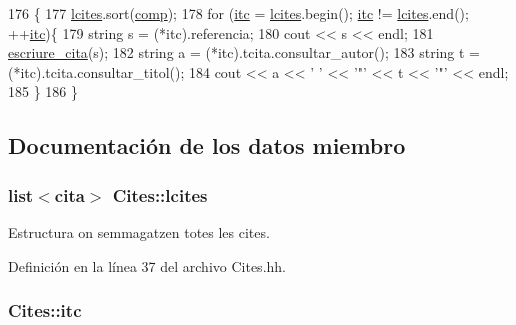 \begin{DoxyCode}
176                           \{
177   \hyperlink{class_cites_a5bcd3b42706ea04fea35fe9db7f5838d}{lcites}.sort(\hyperlink{class_cites_a071081d2ce9dd10f701af8f67409e78f}{comp});
178   \textcolor{keywordflow}{for} (\hyperlink{class_cites_a25951edde2ccf918aa4b2ad7ae6271fa}{itc} = \hyperlink{class_cites_a5bcd3b42706ea04fea35fe9db7f5838d}{lcites}.begin(); \hyperlink{class_cites_a25951edde2ccf918aa4b2ad7ae6271fa}{itc} != \hyperlink{class_cites_a5bcd3b42706ea04fea35fe9db7f5838d}{lcites}.end(); ++\hyperlink{class_cites_a25951edde2ccf918aa4b2ad7ae6271fa}{itc})\{
179     \textcolor{keywordtype}{string} s = (*itc).referencia;
180     cout << s << endl;
181     \hyperlink{class_cites_a959b95c1e881ae212828771c2c876515}{escriure\_cita}(s);
182     \textcolor{keywordtype}{string} a = (*itc).tcita.consultar\_autor();
183     \textcolor{keywordtype}{string} t = (*itc).tcita.consultar\_titol();
184     cout << a << \textcolor{charliteral}{' '} << \textcolor{charliteral}{'"'} << t << \textcolor{charliteral}{'"'} << endl;
185     \}
186 \}
\end{DoxyCode}


\subsection{Documentación de los datos miembro}
\subsubsection[{\texorpdfstring{lcites}{lcites}}]{\setlength{\rightskip}{0pt plus 5cm}list$<${\bf cita}$>$ Cites\+::lcites\hspace{0.3cm}{\ttfamily [private]}}\hypertarget{class_cites_a5bcd3b42706ea04fea35fe9db7f5838d}{}\label{class_cites_a5bcd3b42706ea04fea35fe9db7f5838d}


Estructura on s\textquotesingle{}emmagatzen totes les cites. 



Definición en la línea 37 del archivo Cites.\+hh.

\subsubsection[{\texorpdfstring{itc}{itc}}]{ Cites\+::itc\hspace{0.3cm}{\ttfamily [private]}}\hypertarget{class_cites_a25951edde2ccf918aa4b2ad7ae6271fa}{}\label{class_cites_a25951edde2ccf918aa4b2ad7ae6271fa}


